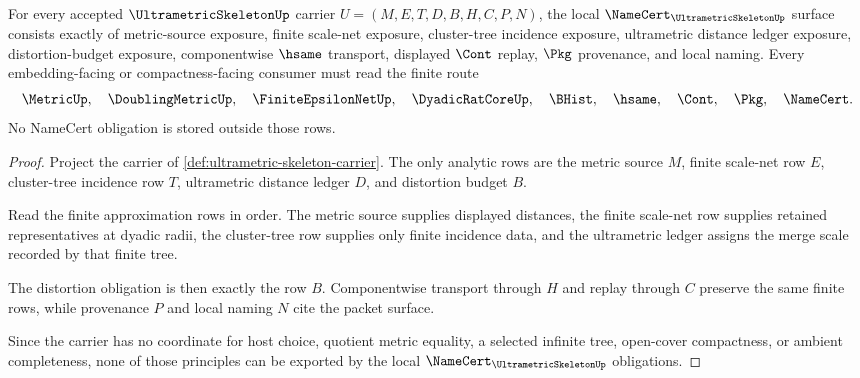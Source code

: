 \begin{theorem}
\label{thm:ultrametric-skeleton-namecert-obligations}
For every accepted $\UltrametricSkeletonUp$ carrier $U=(M,E,T,D,B,H,C,P,N)$, the local $\NameCert_{\UltrametricSkeletonUp}$ surface consists exactly of metric-source exposure, finite scale-net exposure, cluster-tree incidence exposure, ultrametric distance ledger exposure, distortion-budget exposure, componentwise $\hsame$ transport, displayed $\Cont$ replay, $\Pkg$ provenance, and local naming. Every embedding-facing or compactness-facing consumer must read the finite route
$$
\MetricUp,\quad
\DoublingMetricUp,\quad
\FiniteEpsilonNetUp,\quad
\DyadicRatCoreUp,\quad
\BHist,\quad
\hsame,\quad
\Cont,\quad
\Pkg,\quad
\NameCert .
$$
No NameCert obligation is stored outside those rows.
\end{theorem}
\begin{proof}
Project the carrier of \autoref{def:ultrametric-skeleton-carrier}. The only analytic rows are the metric source $M$, finite scale-net row $E$, cluster-tree incidence row $T$, ultrametric distance ledger $D$, and distortion budget $B$.

Read the finite approximation rows in order. The metric source supplies displayed distances, the finite scale-net row supplies retained representatives at dyadic radii, the cluster-tree row supplies only finite incidence data, and the ultrametric ledger assigns the merge scale recorded by that finite tree.

The distortion obligation is then exactly the row $B$. Componentwise transport through $H$ and replay through $C$ preserve the same finite rows, while provenance $P$ and local naming $N$ cite the packet surface.

Since the carrier has no coordinate for host choice, quotient metric equality, a selected infinite tree, open-cover compactness, or ambient completeness, none of those principles can be exported by the local $\NameCert_{\UltrametricSkeletonUp}$ obligations.
\end{proof}


